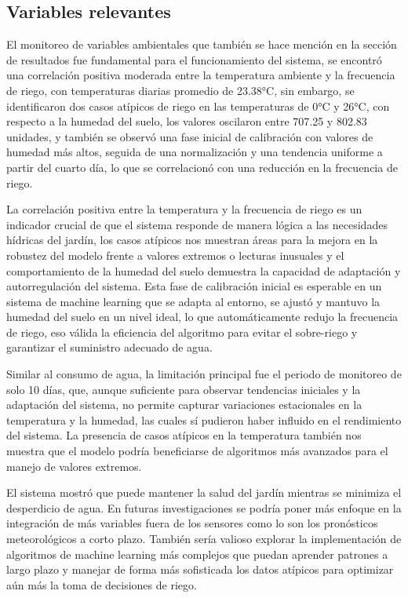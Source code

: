 \documentclass[pdflatex,sn-mathphys-num]{sn-jnl}%
\theoremstyle{thmstyleone}%
\theoremstyle{thmstyletwo}%
\theoremstyle{thmstylethree}%
\begin{document}
\begin{multicols}{2}
\subsection*{Variables relevantes}
El monitoreo de variables ambientales que también se hace mención en la sección de resultados fue fundamental para el funcionamiento del sistema, se encontró una correlación positiva moderada entre la temperatura ambiente y la frecuencia de riego, con temperaturas diarias promedio de 23.38°C, sin embargo, se identificaron dos casos atípicos de riego en las temperaturas de 0°C y 26°C, con respecto a la humedad del suelo, los valores oscilaron entre 707.25 y 802.83 unidades, y también se observó una fase inicial de calibración con valores de humedad más altos, seguida de una normalización y una tendencia uniforme a partir del cuarto día, lo que se correlacionó con una reducción en la frecuencia de riego.

La correlación positiva entre la temperatura y la frecuencia de riego es un indicador crucial de que el sistema responde de manera lógica a las necesidades hídricas del jardín, los casos atípicos nos muestran áreas para la mejora en la robustez del modelo frente a valores extremos o lecturas inusuales y el comportamiento de la humedad del suelo demuestra la capacidad de adaptación y autorregulación del sistema. Esta fase de calibración inicial es esperable en un sistema de machine learning que se adapta al entorno, se ajustó y mantuvo la humedad del suelo en un nivel ideal, lo que automáticamente redujo la frecuencia de riego, eso válida la eficiencia del algoritmo para evitar el sobre-riego y garantizar el suministro adecuado de agua.

Similar al consumo de agua, la limitación principal fue el periodo de monitoreo de solo 10 días, que, aunque suficiente para observar tendencias iniciales y la adaptación del sistema, no permite capturar variaciones estacionales en la temperatura y la humedad, las cuales sí pudieron haber influido en el rendimiento del sistema. La presencia de casos atípicos en la temperatura también nos muestra que el modelo podría beneficiarse de algoritmos más avanzados para el manejo de valores extremos.

El sistema mostró que puede mantener la salud del jardín mientras se minimiza el desperdicio de agua. En futuras investigaciones se podría poner más enfoque en la integración de más variables fuera de los sensores como lo son los pronósticos meteorológicos a corto plazo. También sería valioso explorar la implementación de algoritmos de machine learning más complejos que puedan aprender patrones a largo plazo y manejar de forma más sofisticada los datos atípicos para optimizar aún más la toma de decisiones de riego.

\end{multicols}
\end{document}

